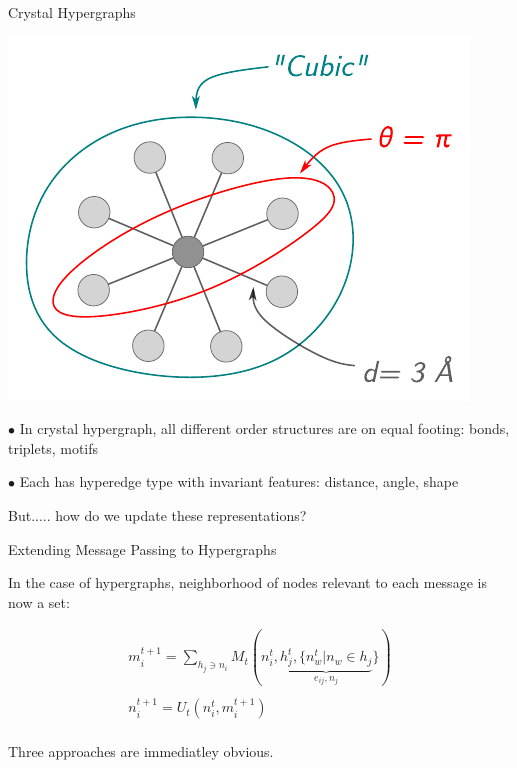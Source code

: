 \documentclass[11pt]{beamer}
\begin{document}
\begin{frame}{Crystal Hypergraphs}


\begin{center}
\includegraphics[scale=0.7]{hypergraph_6.pdf}
\end{center}
\vspace{.5cm}

\medskip

$\bullet$ In crystal hypergraph, all different order structures are on equal footing: bonds, triplets, motifs

\medskip

$\bullet$ Each has hyperedge type with invariant features: distance, angle, shape\pause

\begin{center}
But..... how do we update these representations?
\end{center}
\end{frame}

\begin{frame}{Extending Message Passing to Hypergraphs}

In the case of hypergraphs, neighborhood of nodes relevant to each message is now a set: \pause

\begin{gather*}
m_i^{t+1}=\sum_{h_j\ni n_i} M_t(n_i^{t},\underbrace{h_j^{t},\lbrace  n_w^t \vert n_w \in h_j }_{e_{ij},n_j}\rbrace)\\
\\
n_i^{t+1}=U_t(n_i^t,m_i^{t+1})\\
\end{gather*}

\begin{center}\pause

Three approaches are immediatley obvious.

\end{center}

\end{frame}
\end{document}
